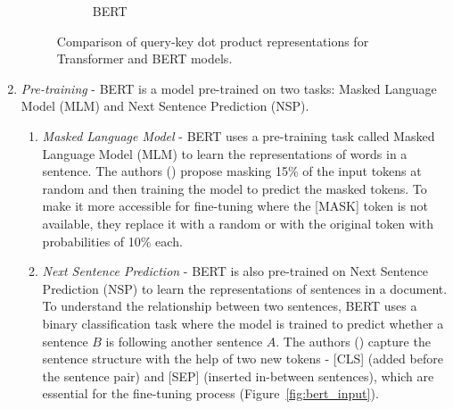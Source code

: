 \begin{enumerate}
\begin{figure}[h]
\begin{subfigure}{0.45\textwidth}
        \end{subfigure}
        \hfill
        \begin{subfigure}{0.45\textwidth}
            \centering
            \caption{BERT}
            \label{fig:bert_grid}
        \end{subfigure}
        \caption{Comparison of query-key dot product representations for Transformer and BERT models.}
        \label{fig:grid_comparison}
    \end{figure}
    \item \emph{Pre-training} - BERT is a model pre-trained on two tasks: Masked Language Model (MLM) and Next Sentence Prediction (NSP).
    \begin{enumerate}
        \item \emph{Masked Language Model} - BERT uses a pre-training task called Masked Language Model (MLM) to learn the representations of words in a sentence.
        The authors (\cite{devlin-etal-2019-bert}) propose masking 15\% of the input tokens at random and then training the model to predict the masked tokens.
        To make it more accessible for fine-tuning where the [MASK] token is not available, they replace it with a random or with the original token with probabilities of 10\% each.
        \item \emph{Next Sentence Prediction} - BERT is also pre-trained on Next Sentence Prediction (NSP) to learn the representations of sentences in a document.
        To understand the relationship between two sentences, BERT uses a binary classification task where the model is trained to predict whether a sentence $B$ is following another sentence $A$.
        The authors (\cite{devlin-etal-2019-bert}) capture the sentence structure with the help of two new tokens - [CLS] (added before the sentence pair) and [SEP] (inserted in-between sentences), which are essential for the fine-tuning process (Figure~\ref{fig:bert_input}).

\end{enumerate}
\end{enumerate}
